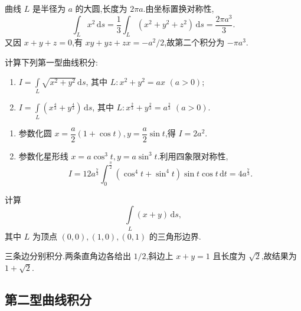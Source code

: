 \begin{solution}
    曲线 $L$ 是半径为 $a$ 的大圆,长度为 $2\pi a$.由坐标置换对称性,
    \[
        \displaystyle\int_Lx^2\,\mathrm{d}s=\dfrac{1}{3}\int_L(x^2+y^2+z^2)\,\mathrm{d}s=\dfrac{2\pi a^3}{3}.
    \]
    又因 $x+y+z=0$,有 $xy+yz+zx=-a^2/2$,故第二个积分为 $-\pi a^3$.
\end{solution}

\begin{example}
    计算下列第一型曲线积分:
    \begin{enumerate}
        \item $\displaystyle I=\int\limits_L\sqrt{x^2+y^2}\,\mathrm{d}s$, 其中 $L:x^2+y^2=ax$ $(a>0)$;
        \item $\displaystyle I=\int\limits_L\left(x^{\frac{4}{3}}+y^{\frac{4}{3}}\right)\,\mathrm{d}s$, 其中 $L:x^{\frac{2}{3}}+y^{\frac{2}{3}}=a^{\frac{2}{3}}$ $(a>0)$.
    \end{enumerate}
\end{example}
\exampleblank

\begin{solution}
    \leavevmode
    \begin{enumerate}
        \item 参数化圆 $x=\dfrac{a}{2}(1+\cos t),y=\dfrac{a}{2}\sin t$,得 $I=2a^2$.
        \item 参数化星形线 $x=a\cos^3t,y=a\sin^3t$.利用四象限对称性,
              \[
                  I=12a^{\frac{7}{3}}\int_0^{\frac{\pi}{2}}(\cos^4t+\sin^4t)\sin t\cos t\,\mathrm{d}t=4a^{\frac{7}{3}}.
              \]
    \end{enumerate}
\end{solution}

\begin{example}
    计算
    \[
        \displaystyle\int\limits_L(x+y)\,\mathrm{d}s,
    \]
    其中 $L$ 为顶点 $(0,0),(1,0),(0,1)$ 的三角形边界.
\end{example}
\exampleblank

\begin{solution}
    三条边分别积分.两条直角边各给出 $1/2$,斜边上 $x+y=1$ 且长度为 $\sqrt{2}$,故结果为 $1+\sqrt{2}$.
\end{solution}



\subsection{第二型曲线积分}

